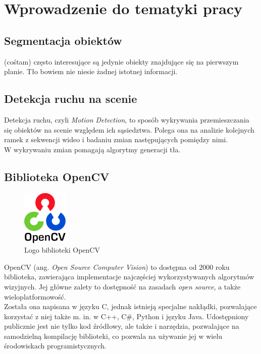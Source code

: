 \chapter{Wprowadzenie do tematyki pracy}
\label{cha:tematykaPracy}
\section{Segmentacja obiektów}
(cośtam) często interesujące są jedynie obiekty znajdujące się na pierwszym planie. Tło bowiem nie niesie żadnej istotnej informacji.
\section{Detekcja ruchu na scenie}
Detekcja ruchu, czyli \textit{Motion Detection}, to sposób wykrywania przemieszczania się obiektów na scenie względem ich sąsiedztwa. Polega ona na analizie kolejnych ramek z sekwencji wideo i badaniu zmian następujących pomiędzy nimi.\\
W wykrywaniu zmian pomagają algorytmy generacji tła. 
\section{Biblioteka OpenCV}
\begin{figure}
\centering

\includegraphics[width=82px]{img/ocv_logo}
\caption{Logo biblioteki OpenCV \cite{OpenCVLogo}}
\end{figure}
OpenCV (ang. \textit{Open Source Computer Vision}) to dostępna od 2000 roku biblioteka, zawierająca implementacje najczęściej wykorzystywanych algorytmów wizyjnych. Jej główne zalety to dostępność na zasadach \textit{open source}, a także wieloplatformowość.\\
Została ona napisana w języku C, jednak istnieją specjalne nakłądki, pozwalające korzystać z niej także m. in. w C++, C\#, Python i języku Java. Udostępniony publicznie jest nie tylko kod źródłowy, ale także i narzędzia, pozwalające na samodzielną kompilację biblioteki, co pozwala na używanie jej w wielu środowiskach programistycznych.
